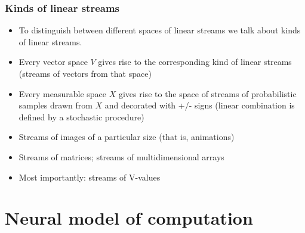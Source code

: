 \documentclass{beamer}
\begin{document}
\begin{frame}

\frametitle{Kinds of linear streams}

\begin{itemize}

\item To distinguish between different spaces of linear streams we talk about
kinds of linear streams.\\[2ex]

\item Every vector space $V$ gives rise to the corresponding kind of linear streams
(streams of vectors from that space)\\[2ex]

\item Every measurable space $X$ gives rise to the space of streams of
probabilistic samples drawn from $X$ and decorated with +/- signs
(linear combination is defined by a stochastic procedure)\\[2ex]

\item Streams of images of a particular size (that is, animations)\\[2ex]

\item Streams of matrices; streams of multidimensional arrays\\[2ex]

\item Most importantly: streams of V-values\\[2ex]



\end{itemize}

\end{frame}

\section{Neural model of computation}
\end{document}
